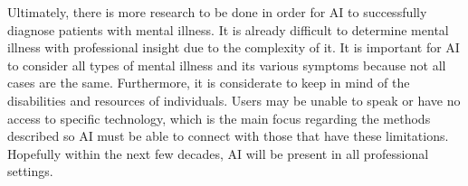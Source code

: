 \documentclass[11pt,technote,twocolumn]{IEEEtran}
\begin{document}
\par
Ultimately, there is more research to be done in order for AI to successfully diagnose patients with mental illness. It is already difficult to determine mental illness with professional insight due to the complexity of it. It is important for AI to consider all types of mental illness and its various symptoms because not all cases are the same. Furthermore, it is considerate to keep in mind of the disabilities and resources of individuals. Users may be unable to speak or have no access to specific technology, which is the main focus regarding the methods described so AI must be able to connect with those that have these limitations. Hopefully within the next few decades, AI will be present in all professional settings.

\printbibliography
\end{document}
